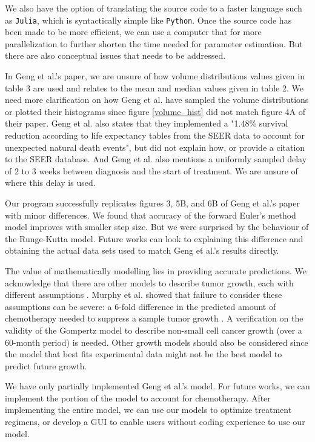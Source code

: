\documentclass[letterpaper
, superscriptaddress
, twocolumn
, aps
]{revtex4}
\begin{document}
We also have the option of translating the source code to a faster language such as \texttt{Julia}, which is syntactically simple like \texttt{Python}. Once the source code has been made to be more efficient, we can use a computer that for more parallelization to further shorten the time needed for parameter estimation. But there are also conceptual issues that needs to be addressed.

In Geng et al.'s paper, we are unsure of how volume distributions values given in table 3 are used and relates to the mean and median values given in table 2. We need more clarification on how Geng et al. have sampled the volume distributions or plotted their histograms since figure \ref{volume_hist} did not match figure 4A of their paper. Geng et al. also states that they implemented a "1.48\% survival reduction according to life expectancy tables from the SEER data to account for unexpected natural death events", but did not explain how, or provide a citation to the SEER database. And Geng et al. also mentions a uniformly sampled delay of 2 to 3 weeks between diagnosis and the start of treatment. We are unsure of where this delay is used.

Our program successfully replicates figures 3, 5B, and 6B of Geng et al.'s paper with minor differences. We found that accuracy of the forward Euler's method model improves with smaller step size. But we were surprised by the behaviour of the Runge-Kutta model. Future works can look to explaining this difference and obtaining the actual data sets used to match Geng et al.'s results directly.

The value of mathematically modelling lies in providing accurate predictions. We acknowledge that there are other models to describe tumor growth, each with different assumptions \cite{Grassberger2016, Benzekry2014, Bertalanffy1957}. Murphy et al. showed that failure to consider these assumptions can be severe: a 6-fold difference in the predicted amount of chemotherapy needed to suppress a sample tumor growth \cite{Murphy2016}. A verification on the validity of the Gompertz model to describe non-small cell cancer growth (over a 60-month period) is needed. Other growth models should also be considered since the model that best fits experimental data might not be the best model to predict future growth.

We have only partially implemented Geng et al.'s model. For future works, we can implement the portion of the model to account for chemotherapy. After implementing the entire model, we can use our models to optimize treatment regimens, or develop a GUI to enable users without coding experience to use our model.
\end{document}

